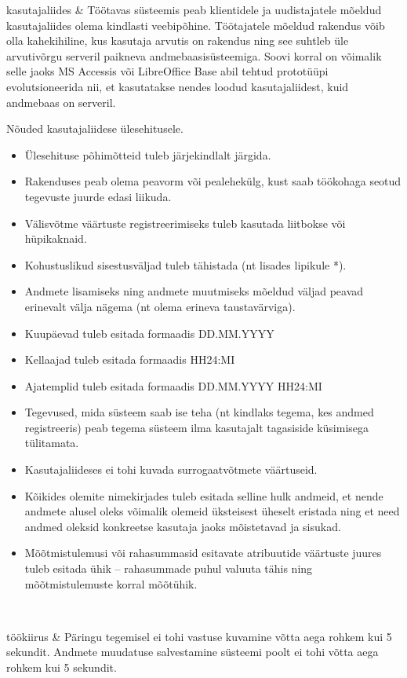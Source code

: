 \begin{longtabu}
	kasutajaliides 
	& Töötavas süsteemis peab klientidele ja uudistajatele mõeldud kasutajaliides olema kindlasti veebipõhine. Töötajatele mõeldud rakendus võib olla kahekihiline, kus kasutaja arvutis on rakendus ning see suhtleb üle arvutivõrgu serveril paikneva andmebaasisüsteemiga. Soovi korral on võimalik selle jaoks MS Accessis või LibreOffice Base abil tehtud prototüüpi evolutsioneerida nii, et kasutatakse nendes loodud kasutajaliidest, kuid andmebaas on serveril.  \linebreak \par
	Nõuded kasutajaliidese ülesehitusele.
	\begin{itemize}
		\item Ülesehituse põhimõtteid tuleb järjekindlalt järgida.
		\item Rakenduses peab olema peavorm või pealehekülg, kust saab töökohaga seotud tegevuste juurde edasi liikuda.
		\item Välisvõtme väärtuste registreerimiseks tuleb kasutada liitbokse või hüpikaknaid.
		\item Kohustuslikud sisestusväljad tuleb tähistada (nt lisades lipikule *).
		\item Andmete lisamiseks ning andmete muutmiseks mõeldud väljad peavad erinevalt välja nägema (nt olema erineva taustavärviga).
		\item Kuupäevad tuleb esitada formaadis DD.MM.YYYY
		\item Kellaajad tuleb esitada formaadis HH24:MI
		\item Ajatemplid tuleb esitada formaadis DD.MM.YYYY HH24:MI
		\item Tegevused, mida süsteem saab ise teha (nt kindlaks tegema, kes andmed registreeris) peab tegema süsteem ilma kasutajalt tagasiside küsimisega tülitamata.
		\item Kasutajaliideses ei tohi kuvada surrogaatvõtmete väärtuseid.
		\item Kõikides olemite nimekirjades tuleb esitada selline hulk andmeid, et nende andmete alusel oleks võimalik olemeid üksteisest üheselt eristada ning et need andmed oleksid konkreetse kasutaja jaoks mõistetavad ja sisukad.
		\item Mõõtmistulemusi või rahasummasid esitavate atribuutide väärtuste juures tuleb esitada ühik – rahasummade puhul valuuta tähis ning mõõtmistulemuste korral mõõtühik.
	\end{itemize} \\ \hline
	
	töökiirus 
	& Päringu tegemisel ei tohi vastuse kuvamine võtta aega rohkem kui 5 sekundit. Andmete muudatuse salvestamine süsteemi poolt ei tohi võtta aega rohkem kui 5 sekundit.  \\ \hline
	

\end{longtabu}

